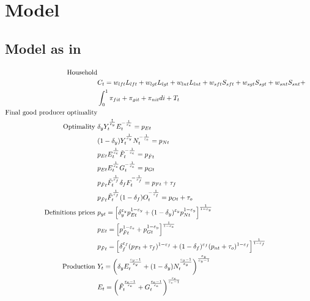 \section{Model}
\subsection{Model as in \cite{Fried2018ClimateAnalysis}}
\begin{align*}
\text{Household}\\
& C_t=w_{lft}L_{lft}+w_{lgt}L_{lgt}+w_{lnt}L_{lnt}+w_{sft}S_{sft}+w_{sgt}S_{sgt}+w_{snt}S_{snt}+\\ &\int_{0}^{1}\pi_{fit}+\pi_{git}+\pi_{nit}di+T_t\\
\text{Final good producer optimality}&\\
\text{Optimality}\ \vspace{4mm}& \delta_yY_t^\frac{1}{\varepsilon_y}E_t^{-\frac{1}{\varepsilon_e}}=p_{Et}\\
& (1-\delta_y)Y_t^\frac{1}{\varepsilon_y}N_t^{-\frac{1}{\varepsilon_e}}=p_{Nt}\\
&
p_{Et}E_t^\frac{1}{\varepsilon_e}\tilde{F}_t^{-\frac{1}{\varepsilon_e}}=p_{\tilde{F}t}\\
& p_{Et}E_t^\frac{1}{\varepsilon_e}G_t^{-\frac{1}{\varepsilon_e}}=p_{Gt}\\
& p_{\tilde{F}t}\tilde{F}_t^\frac{1}{\varepsilon_f}\delta_fF_t^{-\frac{1}{\varepsilon_f}}=p_{Ft}+\tau_{f}\\
& p_{\tilde{F}t}\tilde{F}_t^\frac{1}{\varepsilon_f}(1-\delta_f)O_t^{-\frac{1}{\varepsilon_f}}=p_{Ot}+\tau_{o}\\
\text{Definitions prices}\ \vspace{4mm}&
p_{yt}= \left[\delta_y^{\varepsilon_y}p_{Et}^{1-\varepsilon_y}+(1-\delta_y)^{\varepsilon_y}p_{Nt}^{1-\varepsilon_y}\right]^\frac{1}{1-\varepsilon_y}\\
& p_{Et}= \left[p_{\tilde{F}t}^{1-\varepsilon_e}+p_{Gt}^{1-\varepsilon_y}\right]^\frac{1}{1-\varepsilon_e}\\
& p_{\tilde{F}t}= \left[\delta_f^{\varepsilon_f}(p_{Ft}+\tau_{f})^{1-\varepsilon_f}+(1-\delta_f)^{\varepsilon_f}(p_{nt}+\tau_{o})^{1-\varepsilon_f}\right]^\frac{1}{1-\varepsilon_f}\\
\text{Production}\ \vspace{4mm}& 
Y_t=\left(\delta_yE_t^\frac{\varepsilon_y-1}{\varepsilon_y}+(1-\delta_y)N_t^\frac{\varepsilon_y-1}{\varepsilon_y}\right)^\frac{\varepsilon_y}{\varepsilon_y-1}\\
&E_t=\left(\tilde{F}_t^\frac{\varepsilon_e-1}{\varepsilon_e}+G_t^\frac{\varepsilon_e-1}{\varepsilon_e}\right)^\frac{\varepsilon_e}{\varepsilon_e-1}\\

\end{align*}
